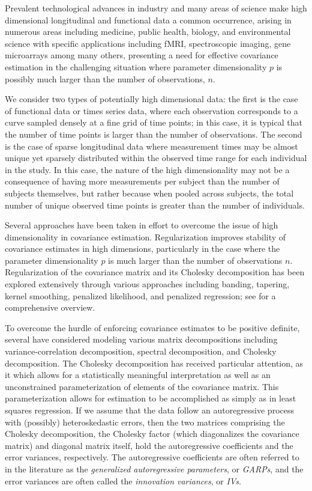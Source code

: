 \documentclass[12pt]{article}
\begin{document}
Prevalent technological advances in industry and many areas of science make high dimensional longitudinal and functional data a common occurrence, arising in numerous areas including medicine, public health, biology, and environmental science with specific applications including fMRI, spectroscopic imaging, gene microarrays among many others, presenting a need for effective covariance estimation in the challenging situation where parameter dimensionality $p$ is possibly much larger than the number of observations, $n$. 

We consider two types of potentially high dimensional data: the first is the case of functional data or times series data, where each observation corresponds to a curve sampled densely at a fine grid of time points; in this case, it is typical that the number of time points is larger than the number of observations. The second is the case of sparse longitudinal data where measurement times may be almost unique yet sparsely distributed within the observed time range for each individual in the study. In this case, the nature of the high dimensionality may not be a consequence of having more measurements per subject than the number of subjects themselves, but rather because when pooled across subjects, the total number of unique observed time points is greater than the number of individuals. 

Several approaches have been taken in effort to overcome the issue of high dimensionality in covariance estimation. Regularization improves stability of covariance estimates in high dimensions, particularly in the case where the parameter dimensionality $p$ is much larger than the number of observations $n$. Regularization of the covariance matrix and its Cholesky decomposition has been explored extensively through various approaches including banding, tapering, kernel smoothing, penalized likelihood, and penalized regression; see \citet{pourahmadi2011covariance} for a comprehensive overview. 
	
To overcome the hurdle of enforcing covariance estimates to be positive definite, several have considered modeling various matrix decompositions including variance-correlation decomposition, spectral decomposition, and Cholesky decomposition. The Cholesky decomposition has received particular attention, as it which allows for a statistically meaningful interpretation as well as an unconstrained parameterization of elements of the covariance matrix. This parameterization allows for estimation to be accomplished as simply as in least squares regression. If we assume that the data follow an autoregressive process with (possibly) heteroskedastic errors, then the two matrices comprising the Cholesky decomposition, the Cholesky factor (which diagonalizes the covariance matrix) and diagonal matrix itself, hold the autoregressive coefficients and the error variances, respectively. The autoregressive coefficients are often referred to in the literature as the \emph{generalized autoregressive parameters}, or \emph{GARPs}, and the error variances are often called the \emph{innovation variances}, or \emph{IVs}.
\end{document}
